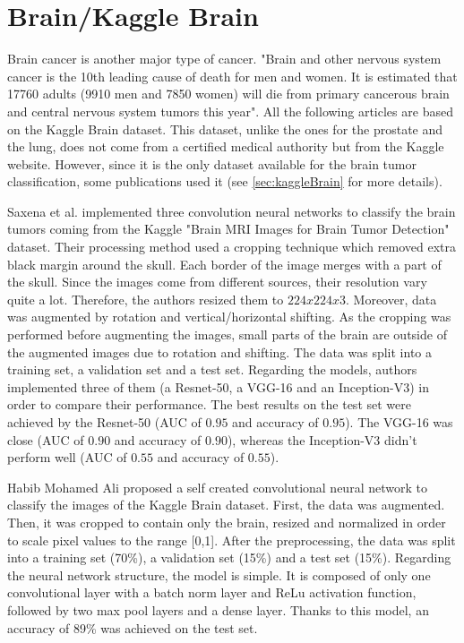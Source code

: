 \section{Brain/Kaggle Brain}
Brain cancer is another major type of cancer. "Brain and other nervous system cancer is the 10th leading cause of death for men and women. It is estimated that 17760 adults (9910 men and 7850 women) will die from primary cancerous brain and central nervous system tumors this year"\cite{43}. All the following articles are based on the Kaggle Brain dataset. This dataset, unlike the ones for the prostate and the lung, does not come from a certified medical authority but from the Kaggle website. However, since it is the only dataset available for the brain tumor classification, some publications used it (see \ref{sec:kaggleBrain} for more details).

Saxena et al. \cite{31} implemented three convolution neural networks to classify the brain tumors coming from the Kaggle "Brain MRI Images for Brain Tumor Detection" dataset. Their processing method used a cropping technique which removed extra black margin around the skull. Each border of the image merges with a part of the skull. Since the images come from different sources, their resolution vary quite a lot. Therefore, the authors resized them to $224x224x3$. Moreover, data was augmented by rotation and vertical/horizontal shifting. As the cropping was performed before augmenting the images, small parts of the brain are outside of the augmented images due to rotation and shifting. The data was split into a training set, a validation set and a test set. Regarding the models, authors implemented three of them (a Resnet-50, a VGG-16 and an Inception-V3) in order to compare their performance. The best results on the test set were achieved by the Resnet-50 (AUC of $0.95$ and accuracy of $0.95$). The VGG-16 was close (AUC of $0.90$ and accuracy of $0.90$), whereas the Inception-V3 didn't perform well (AUC of $0.55$ and accuracy of $0.55$).


Habib Mohamed Ali \cite{04} proposed a self created convolutional neural network to classify the images of the Kaggle Brain dataset. First, the data was augmented. Then, it was cropped to contain only the brain, resized and normalized in order to scale pixel values to the range [0,1]. After the preprocessing, the data was split into a training set (70\%), a validation set (15\%) and a test set (15\%). Regarding the neural network structure, the model is simple. It is composed of only one convolutional layer with a batch norm layer and ReLu activation function, followed by two max pool layers and a dense layer. Thanks to this model, an accuracy of 89\% was achieved on the test set.

